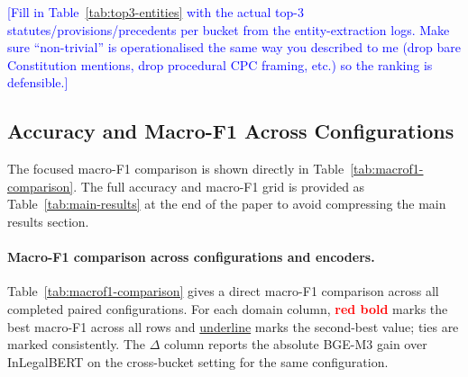 \documentclass[runningheads]{llncs}
\newcommand{\best}[1]{\textbf{\textcolor{red}{#1}}}
\newcommand{\second}[1]{\underline{#1}}
\newcommand{\todo}[1]{\textcolor{blue}{[#1]}}
\begin{document}
\todo{Fill in Table~\ref{tab:top3-entities} with the actual top-3 statutes/provisions/precedents per bucket from the entity-extraction logs. Make sure ``non-trivial'' is operationalised the same way you described to me (drop bare Constitution mentions, drop procedural CPC framing, etc.) so the ranking is defensible.}

\subsection{Accuracy and Macro-F1 Across Configurations}
\label{subsec:results-accuracy}

The focused macro-F1 comparison is shown directly in Table~\ref{tab:macrof1-comparison}. The full accuracy and macro-F1 grid is provided as Table~\ref{tab:main-results} at the end of the paper to avoid compressing the main results section.

\setcounter{table}{3}

\paragraph{Macro-F1 comparison across configurations and encoders.}
Table~\ref{tab:macrof1-comparison} gives a direct macro-F1 comparison across all completed paired configurations. For each domain column, \best{red bold} marks the best macro-F1 across all rows and \second{underline} marks the second-best value; ties are marked consistently. The $\Delta$ column reports the absolute BGE-M3 gain over InLegalBERT on the cross-bucket setting for the same configuration.
\end{document}
